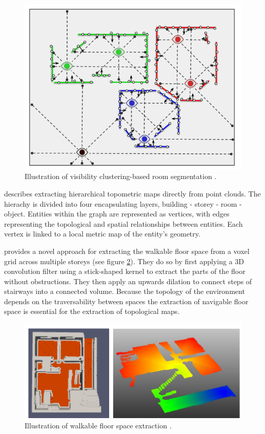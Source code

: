 \begin{figure}[h]
    \centering
    \includegraphics*[width=.7\textwidth]{./fig/visibility_clustering.png}
    \caption{Illustration of visibility clustering-based room segmentation \citep{pintore_state---art_2020}.}
    \label{fig:vis_cluster}
\end{figure}

\citet{ochmann_towards_2014} describes extracting hierarchical topometric maps directly from point clouds. The hierachy is divided into four encapsulating layers, building - storey - room - object. Entities within the graph are represented as vertices, with edges representing the topological and spatial relationships between entities. Each vertex is linked to a local metric map of the entity's geometry. 

\citet{gorte_navigation_2019} provides a novel approach for extracting the walkable floor space from a voxel grid across multiple storeys (see figure \ref{fig:gorte}). They do so by first applying a 3D convolution filter using a stick-shaped kernel to extract the parts of the floor without obstructions. They then apply an upwards dilation to connect steps of stairways into a connected volume. Because the topology of the environment depends on the traversability between spaces the extraction of navigable floor space is essential for the extraction of topological maps.

\begin{figure}[h]
    \centering
    \includegraphics*[width=.7\textwidth]{./fig/gorte.png}
    \caption{Illustration of walkable floor space extraction \citep{gorte_navigation_2019}.}
    \label{fig:gorte}
\end{figure}

